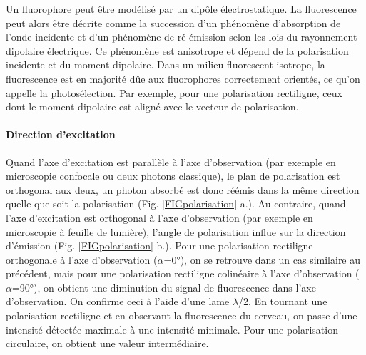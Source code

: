 Un fluorophore peut être modélisé par un dipôle électrostatique. La fluorescence peut alors être décrite comme la succession d'un phénomène d'absorption de l'onde incidente et d'un phénomène de ré-émission selon les lois du rayonnement dipolaire électrique. Ce phénomène est anisotrope et dépend de la polarisation incidente et du moment dipolaire. Dans un milieu fluorescent isotrope, la fluorescence est en majorité dûe aux fluorophores correctement orientés, ce qu'on appelle la photosélection. Par exemple, pour une polarisation rectiligne, ceux dont le moment dipolaire est aligné avec le vecteur de polarisation.


\paragraph{Direction d'excitation}

Quand l'axe d'excitation est parallèle à l'axe d'observation (par exemple en microscopie confocale ou deux photons classique), le plan de polarisation est orthogonal aux deux, un photon absorbé est donc réémis dans la même direction quelle que soit la polarisation (Fig. \ref{FIGpolarisation} a.). Au contraire, quand l'axe d'excitation est orthogonal à l'axe d'observation (par exemple en microscopie à feuille de lumière), l'angle de polarisation influe sur la direction d'émission (Fig. \ref{FIGpolarisation} b.). Pour une polarisation rectiligne orthogonale à l'axe d'observation ($\alpha$=0°), on se retrouve dans un cas similaire au précédent, mais pour une polarisation rectiligne colinéaire à l'axe d'observation ($\alpha$=90°), on obtient une diminution du signal de fluorescence dans l'axe d'observation.
On confirme ceci à l'aide d'une lame $\lambda$/2. En tournant une polarisation rectiligne et en observant la fluorescence du cerveau, on passe d'une intensité détectée maximale à une intensité minimale. Pour une polarisation circulaire, on obtient une valeur intermédiaire.




